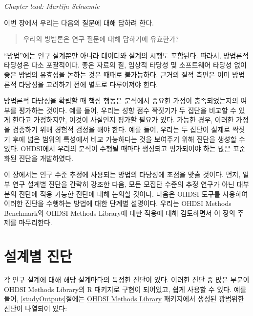 \documentclass[10.5pt]{book}
\theoremstyle{definition}
\theoremstyle{definition}
\theoremstyle{definition}
\theoremstyle{remark}
\begin{document}

\emph{Chapter lead: Martijn Schuemie}

이번 장에서 우리는 다음의 질문에 대해 답하려 한다.

\begin{quote}
우리의 방법론은 연구 질문에 대해 답하기에 유효한가?
\end{quote}

``방법''에는 연구 설계뿐만 아니라 데이터와 설계의 시행도 포함된다.
따라서, 방법론적 타당성은 다소 포괄적이다. 좋은 자료의 질, 임상적 타당성
및 소프트웨어 타당성 없이 좋은 방법의 유효성을 논하는 것은 때때로
불가능하다. 근거의 질적 측면은 이미 방법론적 타당성을 고려하기 전에
별도로 다루어져야 한다.

방법론적 타당성을 확립할 때 핵심 행동은 분석에서 중요한 가정이
충족되었는지의 여부를 평가하는 것이다. 예를 들어, 우리는 성향 점수
짝짓기가 두 집단을 비교할 수 있게 한다고 가정하지만, 이것이 사실인지
평가할 필요가 있다. 가능한 경우, 이러한 가정을 검증하기 위해 경험적
검정을 해야 한다. 예를 들어, 우리는 두 집단이 실제로 짝짓기 후에 넓은
범위의 특성에서 비교 가능하다는 것을 보여주기 위해 진단을 생성할 수
있다. OHDSI에서 우리의 분석이 수행될 때마다 생성되고 평가되어야 하는
많은 표준화된 진단을 개발하였다.

이 장에서는 인구 수준 추정에 사용되는 방법의 타당성에 초점을 맞출
것이다. 먼저, 일부 연구 설계별 진단을 간략히 강조한 다음, 모든 모집단
수준의 추정 연구가 아닌 대부분의 진단에 적용 가능한 진단에 대해 논의할
것이다. 다음은 OHDSI 도구를 사용하여 이러한 진단을 수행하는 방법에 대한
단계별 설명이다. 우리는 OHDSI Methods Benchmark와 OHDSI Methods
Library에 대한 적용에 대해 검토하면서 이 장의 주제를 마무리한다.

\section{설계별 진단}\label{-}


각 연구 설계에 대해 해당 설계마다의 특정한 진단이 있다. 이러한 진단 중
많은 부분이 OHDSI Methods Library의 R 패키지로 구현이 되어있고, 쉽게
사용할 수 있다. 예를 들어, \ref{studyOutputs}절에는
\href{https://ohdsi.github.io/MethodsLibrary/}{OHDSI Methods Library}
패키지에서 생성된 광범위한 진단이 나열되어 있다:
\end{document}
